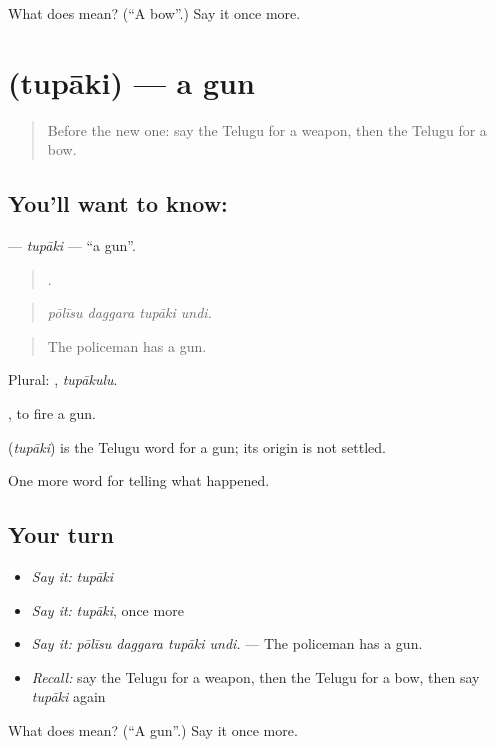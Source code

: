 \begin{tcolorbox}[breakable,colback=teal!4,colframe=teal!35!black,title={Before you move on}]
What does  mean? (\textquotedblleft{}A bow\textquotedblright{}.) Say it once more.
\end{tcolorbox}
\section[\texorpdfstring{\te{తుపాకి} (tupāki)}{తుపాకి (tupāki)}]{ (tupāki) — a gun}

\label{lesson:TE-C360-tupaki}



\begin{quote}
Before the new one: say the Telugu for a weapon, then the Telugu for a bow.
\end{quote}

\subsection*{You'll want to know: }
\textbf{} — \emph{tupāki} — \textquotedblleft{}a gun\textquotedblright{}.

\begin{quote}
   .
\end{quote}

\begin{quote}
\emph{pōlīsu daggara tupāki undi.}
\end{quote}

\begin{quote}
The policeman has a gun.
\end{quote}

Plural: , \emph{tupākulu}.

 , to fire a gun.

\begin{cousinweb}
\textbf{} (\emph{tupāki}) is the Telugu word for a gun; its origin is not settled.
\end{cousinweb}

\begin{grammarlens}[title={What you've built}]
One more word for telling what happened.
\end{grammarlens}

\subsection*{Your turn}
\begin{itemize}
\raggedright
  \item \emph{Say it:} \emph{tupāki}
  \item \emph{Say it:} \emph{tupāki}, once more
  \item \emph{Say it:} \emph{pōlīsu daggara tupāki undi.} — The policeman has a gun.
  \item \emph{Recall:} say the Telugu for a weapon, then the Telugu for a bow, then say \emph{tupāki} again
\end{itemize}

\begin{tcolorbox}[breakable,colback=teal!4,colframe=teal!35!black,title={Before you move on}]
What does  mean? (\textquotedblleft{}A gun\textquotedblright{}.) Say it once more.
\end{tcolorbox}
